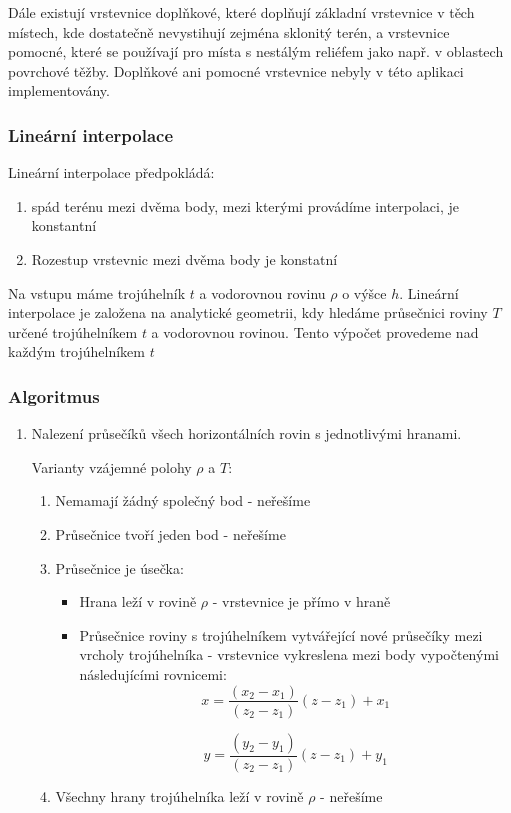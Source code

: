 \documentclass[11pt]{article}
\begin{document}
Dále existují vrstevnice doplňkové, které doplňují základní vrstevnice v těch místech, kde dostatečně nevystihují zejména sklonitý terén, a vrstevnice pomocné, které se používají pro místa s nestálým reliéfem jako např. v oblastech povrchové těžby. Doplňkové ani pomocné vrstevnice nebyly v této aplikaci implementovány.

\subsubsection{Lineární interpolace}
Lineární interpolace předpokládá:
\begin{enumerate}
\item spád terénu mezi dvěma body, mezi kterými provádíme interpolaci, je konstantní
\item Rozestup vrstevnic mezi dvěma body je konstatní
\end{enumerate}

Na vstupu máme trojúhelník $t$ a vodorovnou rovinu $\rho$ o výšce $h$. Lineární interpolace je založena na analytické geometrii, kdy hledáme průsečnici roviny $T$ určené trojúhelníkem $t$ a vodorovnou rovinou. Tento výpočet provedeme nad každým trojúhelníkem $t$

\subsubsection{Algoritmus}

\begin{enumerate}
\item Nalezení průsečíků všech horizontálních rovin s jednotlivými hranami.

Varianty vzájemné polohy $\rho$ a $T$:
	\begin{enumerate}
		\item Nemamají žádný společný bod - neřešíme
		\item Průsečnice tvoří jeden bod - neřešíme
		\item Průsečnice je úsečka:
		\begin{itemize}
		\item Hrana leží v rovině $\rho$ - vrstevnice je přímo v hraně
		\item Průsečnice roviny s trojúhelníkem vytvářející nové průsečíky mezi vrcholy trojúhelníka - vrstevnice vykreslena mezi body vypočtenými následujícími rovnicemi:
		$$  x = \frac{(x_2 - x_1)}{(z_2 - z_1)} (z - z_1) + x_1 $$ 
		
$$  y = \frac{(y_2 - y_1)}{(z_2 - z_1)} (z - z_1) + y_1 $$ 
		\end{itemize}
		\item Všechny hrany trojúhelníka leží v rovině $\rho$ - neřešíme
		
	
	\end{enumerate}

\end{enumerate}
 
\end{document}
